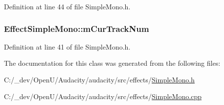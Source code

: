 Definition at line 44 of file Simple\+Mono.\+h.

\subsubsection[{\texorpdfstring{m\+Cur\+Track\+Num}{mCurTrackNum}}]{ Effect\+Simple\+Mono\+::m\+Cur\+Track\+Num\hspace{0.3cm}{\ttfamily [protected]}}\hypertarget{class_effect_simple_mono_abc00b0896f8d699e243bfe9fb5b5f25f}{}\label{class_effect_simple_mono_abc00b0896f8d699e243bfe9fb5b5f25f}


Definition at line 41 of file Simple\+Mono.\+h.



The documentation for this class was generated from the following files\+:\begin{DoxyCompactItemize}
\item 
C\+:/\+\_\+dev/\+Open\+U/\+Audacity/audacity/src/effects/\hyperlink{_simple_mono_8h}{Simple\+Mono.\+h}\item 
C\+:/\+\_\+dev/\+Open\+U/\+Audacity/audacity/src/effects/\hyperlink{_simple_mono_8cpp}{Simple\+Mono.\+cpp}\end{DoxyCompactItemize}
